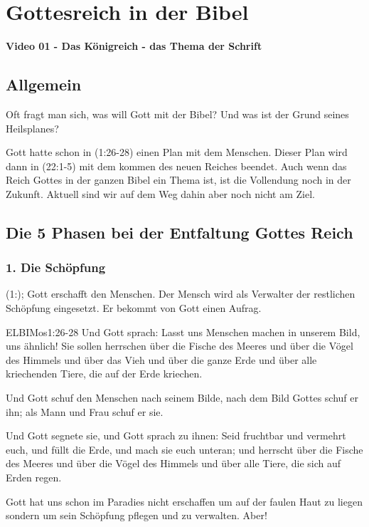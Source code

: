 \documentclass{../../inc/mybib}
\begin{document}
    \tableofcontents
    \section{Gottesreich in der Bibel}
    \textbf{Video 01 - Das Königreich - das Thema der Schrift}
    \subsection{Allgemein}
    Oft fragt man sich, was will Gott mit der Bibel? Und was ist der Grund seines Heilsplanes?

    Gott hatte schon in (1:26-28) einen Plan mit dem Menschen. Dieser Plan wird dann in (22:1-5) mit dem kommen des neuen Reiches beendet. Auch wenn das Reich Gottes in der ganzen Bibel ein Thema ist, ist die Vollendung noch in der Zukunft. Aktuell sind wir auf dem Weg dahin aber noch nicht am Ziel.
    \subsection{Die 5 Phasen bei der Entfaltung Gottes Reich}
    \subsubsection*{1. Die Schöpfung}
    (1:); Gott erschafft den Menschen. Der Mensch wird als Verwalter der restlichen Schöpfung eingesetzt. Er bekommt von Gott einen Aufrag.
    \begin{bibelbox}{ELB}{IMos}{1:26-28}
        Und Gott sprach: \flqq Lasst uns Menschen machen in unserem Bild, uns ähnlich! Sie sollen herrschen über die Fische des Meeres und über die Vögel des Himmels und über das Vieh und über die ganze Erde und über alle kriechenden Tiere, die auf der Erde kriechen.\frqq{}

        Und Gott schuf den Menschen nach seinem Bilde, nach dem Bild Gottes schuf er ihn; als Mann und Frau schuf er sie. 
        
        Und Gott segnete sie, und Gott sprach zu ihnen: \flqq Seid fruchtbar und vermehrt euch, und füllt die Erde, und mach sie euch unteran; und herrscht über die Fische des Meeres und über die Vögel des Himmels und über alle Tiere, die sich auf Erden regen.\frqq{}
    \end{bibelbox}
    Gott hat uns schon im Paradies nicht erschaffen um auf der faulen Haut zu liegen sondern um sein Schöpfung pflegen und zu verwalten. Aber!
\end{document}

